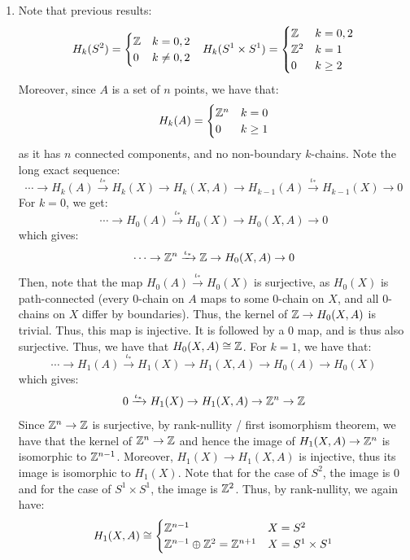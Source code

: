 \documentclass[12pt]{article}
\begin{document}
\begin{solution}
    \bbni
    \begin{enumerate}
        \item Note that previous results: 
        \begin{align*}
            H_k(S^2) &= \begin{cases} \mathbb Z & k = 0, 2 \\ 0 & k \neq 0, 2\end{cases} & H_k(S^1 \times S^1) = \begin{cases} \mathbb Z & k = 0, 2 \\ \mathbb Z^2 & k = 1 \\ 
            0 & k \geq 2
        \end{cases}
        \end{align*}
        Moreover, since $A$ is a set of $n$ points, we have that: 
        \[ H_k(A) = \begin{cases} \mathbb Z^n & k = 0 \\ 0 & k \geq 1\end{cases} \]
        as it has $n$ connected components, and no non-boundary $k$-chains. 
        Note the long exact sequence: 
        \[ \cdots \to H_k(A) \xrightarrow{\iota_*} H_k(X) \to H_k(X,A) \to H_{k-1}(A) \xrightarrow{\iota_*} H_{k-1}(X) \to 0\]
        For $k = 0$, we get: 
        \[ \cdots \to H_0(A) \xrightarrow{\iota_*} H_0(X) \to H_0(X,A) \to 0\]which gives:
        \[ \cdots \to \mathbb Z^n \xrightarrow{\iota_*} \mathbb Z \to H_0(X,A) \to 0\]
        Then, note that the map $H_0(A) \xrightarrow{\iota_*} H_0(X)$ is surjective, as $H_0(X)$ is path-connected (every $0$-chain on $A$ maps to some $0$-chain on $X$, and all $0$-chains on $X$ differ by boundaries). Thus, the kernel of $\mathbb Z \to H_0(X, A)$ is trivial. Thus, this map is injective. It is followed by a $0$ map, and is thus also surjective. Thus, we have that $H_0(X, A) \cong \mathbb Z$. \bbni
        For $k = 1$, we have that:
        \[ \cdots \to H_1(A) \xrightarrow{\iota_*} H_1(X) \to H_1(X,A) \to H_0(A) \to H_0(X)\]
        which gives:
        \[ 0 \xrightarrow{\iota_*} H_1(X) \to H_1(X,A) \to \mathbb Z^n \to \mathbb Z \]      
        Since $\mathbb Z^n \to \mathbb Z$ is surjective, by rank-nullity / first isomorphism theorem, we have that the kernel of $\mathbb Z^n \to \mathbb Z$ and hence the image of $H_1(X, A) \to \mathbb Z^n$ is isomorphic to $\mathbb Z^{n-1}$. Moreover, $H_1(X) \to H_1(X, A)$ is injective, thus its image is isomorphic to $H_1(X)$. Note that for the case of $S^2$, the image is $0$ and for the case of $S^1 \times S^1$, the image is $\mathbb Z^2$. Thus, by rank-nullity, we again have:
        \[ H_1(X, A) \cong \begin{cases} \mathbb Z^{n-1} & X = S^2 \\ \mathbb Z^{n-1} \oplus \mathbb Z^2 = \mathbb Z^{n+1} & X = S^1 \times S^1\end{cases}\]

\end{enumerate}
\end{solution}
\end{document}
